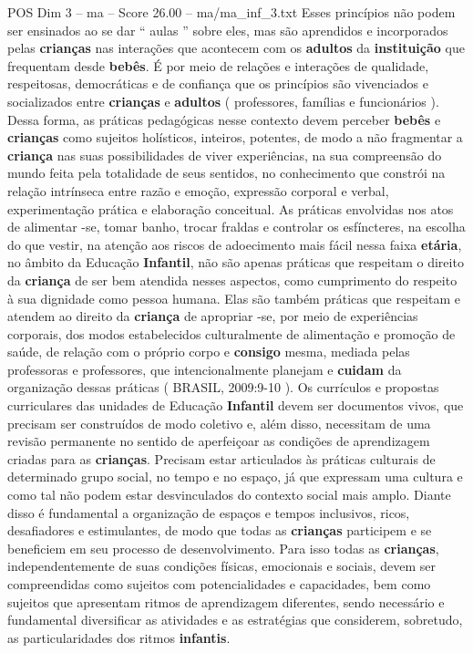\begin{textsample}{POS Dim 3 – ma – Score 26.00 – ma/ma\_inf\_3.txt}
Esses princípios não podem ser ensinados ao se dar “ aulas ” sobre eles, mas são aprendidos e incorporados pelas \textbf{crianças} nas interações que acontecem com os \textbf{adultos} da \textbf{instituição} que frequentam desde \textbf{bebês}.
É por meio de relações e interações de qualidade, respeitosas, democráticas e de confiança que os princípios são vivenciados e socializados entre \textbf{crianças} e \textbf{adultos} ( professores, famílias e funcionários ).
Dessa forma, as práticas pedagógicas nesse contexto devem perceber \textbf{bebês} e \textbf{crianças} como sujeitos holísticos, inteiros, potentes, de modo a não fragmentar a \textbf{criança} nas suas possibilidades de viver experiências, na sua compreensão do mundo feita pela totalidade de seus sentidos, no conhecimento que constrói na relação intrínseca entre razão e emoção, expressão corporal e verbal, experimentação prática e elaboração conceitual.
As práticas envolvidas nos atos de alimentar -se, tomar banho, trocar fraldas e controlar os esfíncteres, na escolha do que vestir, na atenção aos riscos de adoecimento mais fácil nessa faixa \textbf{etária}, no âmbito da Educação \textbf{Infantil}, não são apenas práticas que respeitam o direito da \textbf{criança} de ser bem atendida nesses aspectos, como cumprimento do respeito à sua dignidade como pessoa humana.
Elas são também práticas que respeitam e atendem ao direito da \textbf{criança} de apropriar -se, por meio de experiências corporais, dos modos estabelecidos culturalmente de alimentação e promoção de saúde, de relação com o próprio corpo e \textbf{consigo} mesma, mediada pelas professoras e professores, que intencionalmente planejam e \textbf{cuidam} da organização dessas práticas ( BRASIL, 2009:9-10 ).
Os currículos e propostas curriculares das unidades de Educação \textbf{Infantil} devem ser documentos vivos, que precisam ser construídos de modo coletivo e, além disso, necessitam de uma revisão permanente no sentido de aperfeiçoar as condições de aprendizagem criadas para as \textbf{crianças}.
Precisam estar articulados às práticas culturais de determinado grupo social, no tempo e no espaço, já que expressam uma cultura e como tal não podem estar desvinculados do contexto social mais amplo.
Diante disso é fundamental a organização de espaços e tempos inclusivos, ricos, desafiadores e estimulantes, de modo que todas as \textbf{crianças} participem e se beneficiem em seu processo de desenvolvimento.
Para isso todas as \textbf{crianças}, independentemente de suas condições físicas, emocionais e sociais, devem ser compreendidas como sujeitos com potencialidades e capacidades, bem como sujeitos que apresentam ritmos de aprendizagem diferentes, sendo necessário e fundamental diversificar as atividades e as estratégias que considerem, sobretudo, as particularidades dos ritmos \textbf{infantis}.

\end{textsample}
